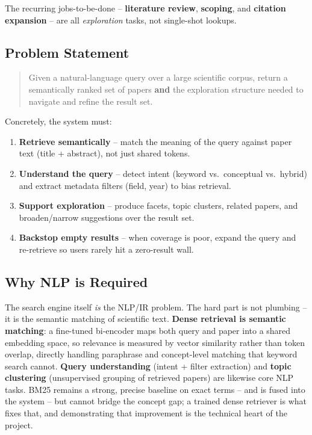 \documentclass[12pt,a4paper]{article}
\begin{document}
The recurring jobs-to-be-done -- \textbf{literature review}, \textbf{scoping}, and \textbf{citation expansion} -- are all \emph{exploration} tasks, not single-shot lookups.

\subsection{Problem Statement}

\begin{quote}
Given a natural-language query over a large scientific corpus, return a semantically ranked set of papers \textbf{and} the exploration structure needed to navigate and refine the result set.
\end{quote}

Concretely, the system must:
\begin{enumerate}
  \item \textbf{Retrieve semantically} -- match the meaning of the query against paper text (title + abstract), not just shared tokens.
  \item \textbf{Understand the query} -- detect intent (keyword vs.\ conceptual vs.\ hybrid) and extract metadata filters (field, year) to bias retrieval.
  \item \textbf{Support exploration} -- produce facets, topic clusters, related papers, and broaden/narrow suggestions over the result set.
  \item \textbf{Backstop empty results} -- when coverage is poor, expand the query and re-retrieve so users rarely hit a zero-result wall.
\end{enumerate}

\subsection{Why NLP is Required}

The search engine itself \emph{is} the NLP/IR problem. The hard part is not plumbing -- it is the semantic matching of scientific text. \textbf{Dense retrieval is semantic matching}: a fine-tuned bi-encoder maps both query and paper into a shared embedding space, so relevance is measured by vector similarity rather than token overlap, directly handling paraphrase and concept-level matching that keyword search cannot. \textbf{Query understanding} (intent + filter extraction) and \textbf{topic clustering} (unsupervised grouping of retrieved papers) are likewise core NLP tasks. BM25 remains a strong, precise baseline on exact terms -- and is fused into the system -- but cannot bridge the concept gap; a trained dense retriever is what fixes that, and demonstrating that improvement is the technical heart of the project.
\end{document}
